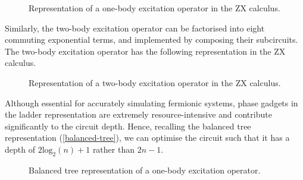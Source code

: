 \begin{figure}[H]
    \centering
    \caption{Representation of a one-body excitation operator in the ZX calculus.}
\end{figure}

Similarly, the two-body excitation operator can be factorised into eight commuting exponential terms, and implemented by composing their subcircuits. The two-body excitation operator has the following representation in the ZX calculus.

\begin{figure}[H]
    \centering
    \caption{Representation of a two-body excitation operator in the ZX calculus.}
\end{figure}

Although essential for accurately simulating fermionic systems, phase gadgets in the ladder representation are extremely resource-intensive and contribute significantly to the circuit depth. Hence, recalling the balanced tree representation (\ref{balanced-tree}), we can optimise the circuit such that it has a depth of $2\text{log}_2(n) + 1$ rather than $2n - 1$.

\begin{figure}[H]
    \centering
    \caption{Balanced tree representation of a one-body excitation operator.}
\end{figure}
